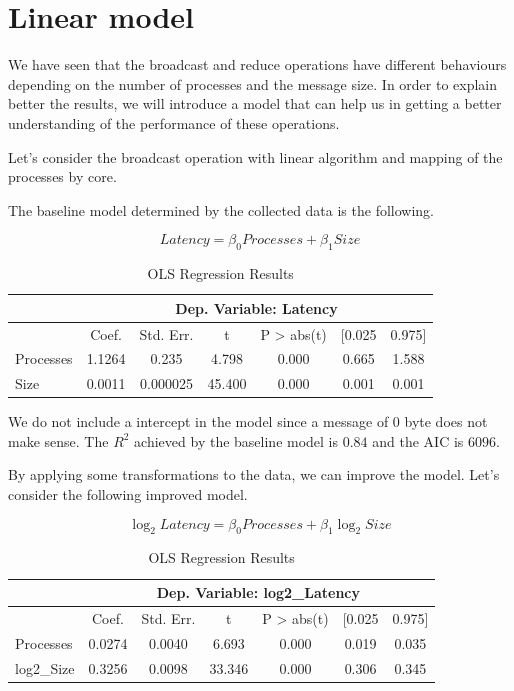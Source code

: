 \section{Linear model}

We have seen that the broadcast and reduce operations have different behaviours depending on the number of processes and the message size. In order to explain better the results, we will introduce a model that can help us in getting a better understanding of the performance of these operations.

Let's consider the broadcast operation with linear algorithm and mapping of the processes by core. 

The baseline model determined by the collected data is the following.

\begin{equation}
    Latency = \beta_0 Processes + \beta_1 Size
\end{equation}

\begin{table}[htbp]
    \centering
    \caption{OLS Regression Results}
    \begin{tabular}{lcccccc}
    \hline
    \hline
     & \multicolumn{6}{c}{Dep. Variable: Latency} \\
    \hline
     & Coef. & Std. Err. & t & P \textgreater{} abs(t) & [0.025 & 0.975] \\
    \hline
    Processes & 1.1264 & 0.235 & 4.798 & 0.000 & 0.665 & 1.588 \\
    Size & 0.0011 & 0.000025 & 45.400 & 0.000 & 0.001 & 0.001 \\
    \hline
    \end{tabular}
\end{table}
We do not include a intercept in the model since a message of $0$ byte does not make sense. The $R^2$ achieved by the baseline model is $0.84$ and the AIC is $6096$.
    

By applying some transformations to the data, we can improve the model.
Let's consider the following improved model.

\begin{equation}
    \log_{2}Latency = \beta_0 Processes + \beta_1 \log_{2} Size
\end{equation}

\begin{table}[htbp]
    \centering
    \caption{OLS Regression Results}
    \begin{tabular}{lcccccc}
    \hline
     & \multicolumn{6}{c}{Dep. Variable: log2\_Latency} \\
    \hline
     & Coef. & Std. Err. & t & P \textgreater{} abs(t) & [0.025 & 0.975] \\
    \hline
    Processes & 0.0274 & 0.0040 & 6.693 & 0.000 & 0.019 & 0.035 \\
    log2\_Size & 0.3256 & 0.0098 & 33.346 & 0.000 & 0.306 & 0.345 \\
    \hline
    \end{tabular}
\end{table}

